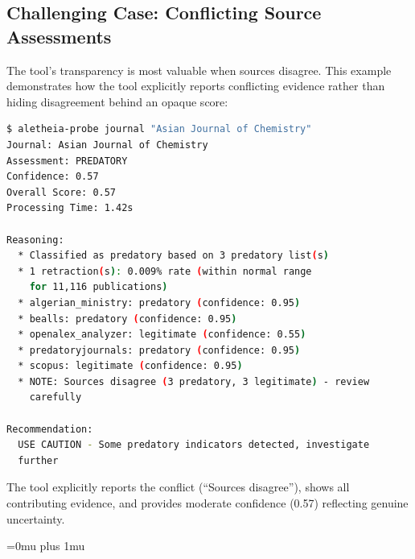 \documentclass[fleqn,10pt]{SelfArx}
\begin{document}
\subsection{Challenging Case: Conflicting Source Assessments}

The tool's transparency is most valuable when sources disagree. This
example demonstrates how the tool explicitly reports conflicting
evidence rather than hiding disagreement behind an opaque score:

\begin{lstlisting}[language=bash,basicstyle=\ttfamily\scriptsize]
$ aletheia-probe journal "Asian Journal of Chemistry"
Journal: Asian Journal of Chemistry
Assessment: PREDATORY
Confidence: 0.57
Overall Score: 0.57
Processing Time: 1.42s

Reasoning:
  * Classified as predatory based on 3 predatory list(s)
  * 1 retraction(s): 0.009% rate (within normal range
    for 11,116 publications)
  * algerian_ministry: predatory (confidence: 0.95)
  * bealls: predatory (confidence: 0.95)
  * openalex_analyzer: legitimate (confidence: 0.55)
  * predatoryjournals: predatory (confidence: 0.95)
  * scopus: legitimate (confidence: 0.95)
  * NOTE: Sources disagree (3 predatory, 3 legitimate) - review
    carefully

Recommendation:
  USE CAUTION - Some predatory indicators detected, investigate
  further
\end{lstlisting}

The tool explicitly reports
the conflict (``Sources disagree''), shows all contributing evidence,
and provides moderate confidence (0.57) reflecting genuine uncertainty.

\onecolumn
{}
\sloppy
\Urlmuskip=0mu plus 1mu\relax
\printbibliography
\end{document}
